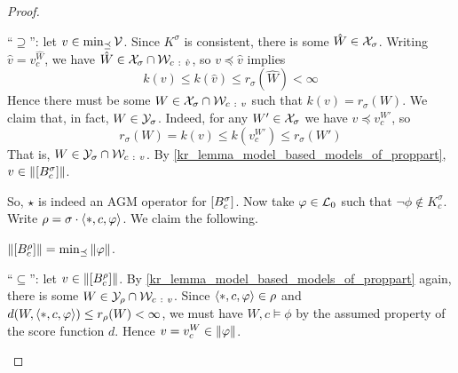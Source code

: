 \begin{proof}
\begin{claimproof}
            ``$\supseteq$'': let $v \in \min_{\preceq}\mathcal{V}$. Since $K^\sigma$
            is consistent, there is some $\hat{W} \in \mathcal{X}_\sigma$.  Writing
            $\hat{v} = v^{\hat{W}}_c$, we have $\hat{W} \in \mathcal{X}_\sigma \cap
            \mathcal{W}_{c\ :\ \hat{v}}$, so $v \preceq \hat{v}$ implies
            \[
                k(v)
                \le k(\hat{v})
                \le r_\sigma(\hat{W})
                < \infty
            \]
            Hence there must be some $W \in \X_\sigma \cap \W_{c\ :\ v}$ such
            that $k(v) = r_\sigma(W)$. We claim that, in fact, $W \in
            \mathcal{Y}_\sigma$. Indeed, for any $W' \in \mathcal{X}_\sigma$ we have $v \preceq
            v^{W'}_c$, so
            \[
                r_\sigma(W)
                = k(v)
                \le k(v^{W'}_c)
                \le r_\sigma(W')
            \]
            That is, $W \in \Y_\sigma \cap \W_{c\ :\  v}$. By
            \cref{kr_lemma_model_based_models_of_proppart}, $v \in
            \|{\left[{B^\sigma_c}\right]}\|$.
        \end{claimproof}

    So, $\star$ is indeed an AGM operator for $\left[{B^\sigma_c}\right]$. Now take
    $\varphi \in \mathcal{L}{}_0$ such that $\neg\phi \notin K^\sigma_c$. Write $\rho =
    \sigma \cdot \langle {\ast, c, \varphi} \rangle$. We claim the following.

        \begin{claim}
            \label{kr_claim_propmods_rho_min_models_of_phi}
            $\|{\left[{B^\rho_c}\right]}\| =
            \min\nolimits_{\preceq}{\|{\varphi}\|}$.
        \end{claim}
        \begin{claimproof}
            ``$\subseteq$'': let $v \in \|{\left[{B^\rho_c}\right]}\|$.  By
            \cref{kr_lemma_model_based_models_of_proppart} again, there is some $W
            \in \mathcal{Y}_\rho \cap \mathcal{W}_{c\ :\  v}$. Since $\langle {\ast, c, \varphi} \rangle \in
            \rho$ and $d(W, \langle {\ast, c, \varphi} \rangle) \le r_\rho(W) < \infty$, we
            must have $W, c \models \phi$ by the assumed property of the score
            function $d$. Hence $v = v^W_c \in \|{\varphi}\|$.


\end{claimproof}
\end{proof}
